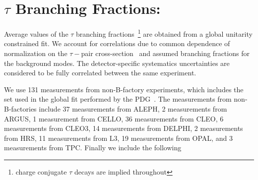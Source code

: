 \documentclass[fleqn,twoside]{article}
\begin{document}
\section{$\tau$ Branching Fractions:}
\label{sec:Tau_BR}

Average values of the $\tau$ branching fractions~\footnote{charge conjugate $\tau$ decays are implied throughout}
are obtained from a global unitarity constrained fit.
We account for correlations due to common dependence of
normalization on the $\tau-$pair cross-section~\cite{Banerjee:2007is}
and assumed branching fractions for the background modes. 
The detector-specific systematics uncertainties are considered to be fully correlated between the same experiment.

We use 131 measurements from non-B-factory experiments, 
which includes the set used in the global fit performed by the PDG~\cite{PDG_2010}. 
The measurements from non-B-factories include
     37 measurements from ALEPH,
      2 measurements from ARGUS,
      1 measurement from CELLO,
     36 measurements from CLEO,
      6 measurements from CLEO3,
     14 measurements from DELPHI,
      2 measurements from HRS,
     11 measurements from L3,
     19 measurements from OPAL, and
      3 measurements from TPC.
Finally we include the following
\end{document}
